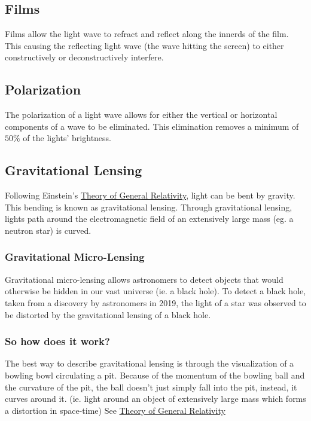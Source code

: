 \documentclass{article}
\begin{document}
\subsection{Films}
Films allow the light wave to refract and reflect along the innerds of the film. This causing the reflecting light wave (the wave hitting the screen) to either constructively or deconstructively interfere.

\subsection{Polarization}
The polarization of a light wave allows for either the vertical or horizontal components of a wave to be eliminated. This elimination removes a minimum of $50\%$ of the lights' brightness.

\subsection{Gravitational Lensing}\label{sec:gravitational_lensing}
Following Einstein's \hyperref[sec:generalrelativity]{Theory of General Relativity}, light can be bent by gravity. This bending is known as gravitational lensing. Through gravitational lensing, lights path around the electromagnetic field of an extensively large mass (eg. a neutron star) is curved.

\subsubsection{Gravitational Micro-Lensing}
Gravitational micro-lensing allows astronomers to detect objects that would otherwise be hidden in our vast universe (ie. a black hole). To detect a black hole, taken from a discovery by astronomers in 2019, the light of a star was observed to be distorted by the gravitational lensing of a black hole.

\subsubsection{So how does it work?}
The best way to describe gravitational lensing is through the visualization of a bowling bowl circulating a pit. Because of the momentum of the bowling ball and the curvature of the pit, the ball doesn't just simply fall into the pit, instead, it curves around it. (ie. light around an object of extensively large mass which forms a distortion in space-time) See \hyperref[sec:generalrelativity]{Theory of General Relativity}
\end{document}

